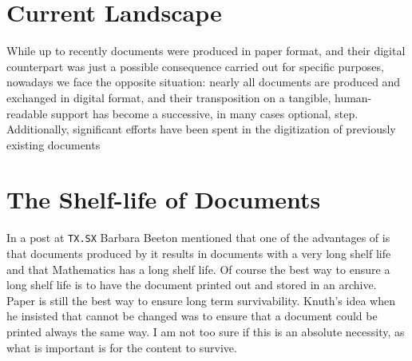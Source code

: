 \section {Current Landscape}

While up to recently documents were produced in paper format, and their digital
counterpart was just a possible consequence carried out for specific purposes,
nowadays we face the opposite situation: nearly all documents are produced and
exchanged in digital format, and their transposition on a tangible, human-readable
support has become a successive, in many cases optional, step. Additionally, significant
efforts have been spent in the digitization of previously existing documents


\section{The Shelf-life of Documents}

In a post at \texttt{TX.SX} Barbara Beeton mentioned that one of the advantages of \tex is that documents produced by it results in documents with a very long shelf life and that Mathematics has a long shelf life.
Of course the best way to ensure a long shelf life is to have the document printed out and stored in an archive.
Paper is still the best way to ensure long term survivability. Knuth’s idea when he insisted that \tex cannot be changed was to ensure that a document could be printed always the same way. I am not too sure if this is an absolute necessity, as what is important is for the content to survive.

